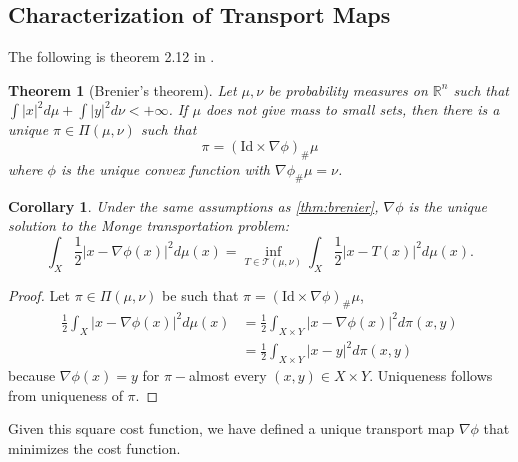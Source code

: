 \documentclass[12pt]{article}
\newcommand{\R}{\mathbb{R}}
\theoremstyle{plain}
\newtheorem{thm}{Theorem}[section]
\newtheorem{cor}{Corollary}[section]
\newtheorem{prop}{Proposition}[section]
\newtheorem{defn}{Definition}[section]
\numberwithin{equation}{section}
\begin{document}
\subsection{Characterization of Transport Maps}
The following is theorem 2.12 in \cite{villani}.
\begin{thm}[Brenier's theorem]\label{thm:brenier}
Let $\mu,\nu$ be probability measures on $\R^n$ such that $\int |x|^2 d\mu + \int |y|^2d\nu < +\infty$. If $\mu$ does not give mass to small sets, then there is a unique $\pi\in\Pi(\mu,\nu)$ such that 
\[\pi = (\text{Id}\times \nabla \phi)_\#\mu\]
where $\phi$ is the unique convex function with $\nabla\phi_\#\mu = \nu$.
\end{thm}
\begin{cor}\label{cor:transport}
  Under the same assumptions as \autoref{thm:brenier}, $\nabla\phi$ is the unique solution to the Monge transportation problem:
  \[\int_X\frac{1}{2}|x-\nabla\phi(x)|^2d\mu(x) = \inf_{T\in\mathcal{T}(\mu,\nu)}\int_X\frac{1}{2}|x-T(x)|^2d\mu(x).\]
\end{cor}
\begin{proof}
  Let $\pi\in \Pi(\mu,\nu)$ be such that $\pi = (\text{Id}\times\nabla \phi)_\#\mu$, 
  \begin{align*}
    \frac{1}{2}\int_X|x-\nabla \phi(x)|^2d\mu(x) &=\frac{1}{2}  \int_{X\times Y}|x-\nabla \phi(x)|^2d\pi(x,y)\\
    &=\frac{1}{2}\int_{X\times Y}|x-y|^2d\pi(x,y)
  \end{align*}
  because $\nabla \phi(x) = y$ for $\pi-$almost every $(x,y)\in X\times Y$. Uniqueness follows from uniqueness of $\pi$.
\end{proof}
Given this square cost function, we have defined a unique transport map $\nabla \phi$ that minimizes the cost function. 
\end{document}

